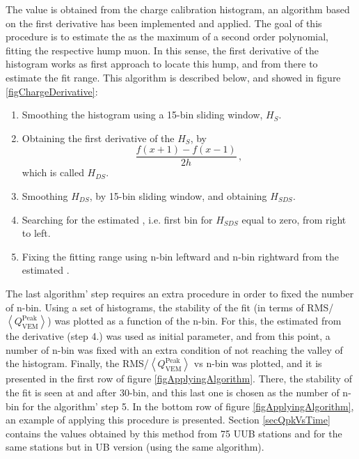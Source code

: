 \documentclass[twoside, final, 10pt]{articleMine}
\begin{document}
The \qpkvem value is obtained from the charge calibration
histogram, an algorithm based on the first derivative has been
implemented and applied. The goal of this procedure is to
estimate the \qpkvem as the maximum of a second order polynomial,
fitting the respective hump muon. In this sense, the first
derivative of the histogram works as first approach to locate
this hump, and from there to estimate the fit range. This
algorithm is described below, and showed in figure
\ref{figChargeDerivative}:

\begin{enumerate}
  \item Smoothing the histogram using a 15-bin sliding window,
    $H_S$.
  \item Obtaining the first derivative of the $H_S$, by
    \begin{equation}
      \frac{f(x+1)-f(x-1)}{2h} \, ,
    \end{equation}
    which is called $H_{DS}$.
  \item Smoothing $H_{DS}$, by 15-bin sliding window, and
    obtaining $H_{SDS}$.
  \item Searching for the estimated \qpkvem, i.e. first bin for
    $H_{SDS}$ equal to zero, from right to left.
  \item Fixing the fitting range using n-bin leftward and n-bin
    rightward from the estimated \qpkvem.
\end{enumerate}
The last algorithm' step requires an extra procedure in order to
fixed the number of n-bin. Using a set of histograms, the
stability of the fit (in terms of RMS/$\left<
Q^\mathrm{Peak}_\mathrm{VEM} \right>$) was plotted as a function
of the n-bin. For this, the estimated \qpkvem from the derivative
(step 4.) was used as initial parameter, and from this point, a
number of n-bin was fixed with an extra condition of not reaching
the valley of the histogram. Finally, the
RMS/$\left<Q^\mathrm{Peak}_\mathrm{VEM}\right>$ vs n-bin was
plotted, and it is presented in the first row of figure
\ref{figApplyingAlgorithm}. There, the stability of the fit
is seen at and after 30-bin, and this last one is chosen as the
number of n-bin for the algorithm' step 5. In the bottom row of
figure \ref{figApplyingAlgorithm}, an example of applying this
procedure is presented. Section \ref{secQpkVsTime} contains the
\qpkvem values obtained by this method from 75 UUB stations
and for the same stations but in UB version (using the same
algorithm).
\clearpage
\end{document}
